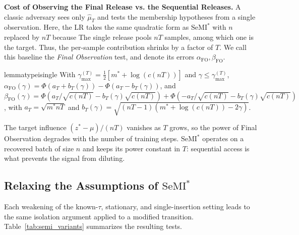 \documentclass{article}
\theoremstyle{plain}
\theoremstyle{definition}
\theoremstyle{remark}
\renewcommand{\leq}{\leqslant}
\newcommand{\SeMIstar}{\mathrm{SeMI}^{\ast}}
\begin{document}
\textbf{Cost of Observing the Final Release vs. the Sequential Releases.} A classic adversary sees only $\hat{\mu}_T$ and tests the membership hypotheses from a single observation. Here, the LR takes the same quadratic form as $\SeMIstar$ with $n$ replaced by $nT$ because The single release pools $nT$ samples, among which one is the target.
Thus, the per-sample contribution shrinks by a factor of $T$. We call this baseline the \emph{Final Observation} test, and denote its errors $\alpha_{\mathrm{FO}}, \beta_{\mathrm{FO}}$.
\begin{restatable}{lemma}{typeisingle}
    \label{lem:type1-single}
    With $\gamma_{\max}^{(T)} = \frac{1}{2}\left[m^* + \log\left(c(nT)\right)\right]$ and $\gamma \leq \gamma_{\max}^{(T)}$,
    $\alpha_{\mathrm{FO}}(\gamma) = \Phi(a_T + b_T(\gamma)) - \Phi(a_T - b_T(\gamma))$, and $\beta_{\mathrm{FO}}(\gamma) = \Phi\left(a_T/\sqrt{c(nT)} - b_T(\gamma)\sqrt{c(nT)}\right) + \Phi\left(-a_T/\sqrt{c(nT)} - b_T(\gamma)\sqrt{c(nT)}\right)$,
    with $a_T = \sqrt{m^* nT}$ and $b_T(\gamma) = \sqrt{(nT-1)\left(m^* + \log(c(nT)) - 2\gamma\right)}$.
\end{restatable}

The target influence $(z^*-\mu)/(nT)$ vanishes as $T$ grows, so the power of Final Observation degrades with the number of training steps. $\SeMIstar$ operates on a recovered batch of size $n$ and keeps its power constant in $T$: sequential access is what prevents the signal from diluting.


\subsection{Relaxing the Assumptions of $\SeMIstar$}\label{sec:variations}\vspace*{-0.3em}

Each weakening of the known-$\tau$, stationary, and single-insertion setting leads to the same isolation argument applied to a modified transition. Table~\ref{tab:semi_variants} summarizes the resulting tests.
\end{document}
